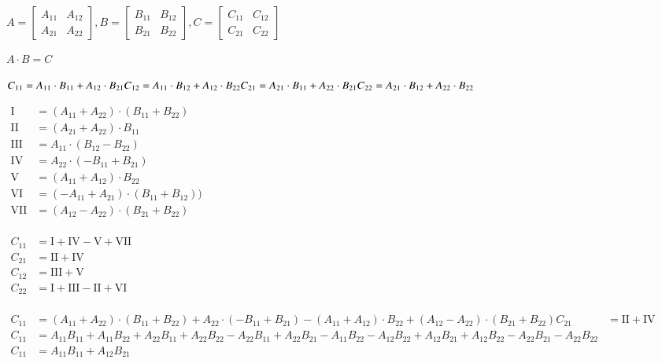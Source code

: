 \documentclass[border=10pt,varwidth]{standalone}
\begin{document}
$
A=
\begin{bmatrix}
A_{11} & A_{12}\\
A_{21} & A_{22}
\end{bmatrix},
B=
\begin{bmatrix}
B_{11} & B_{12}\\
B_{21} & B_{22}
\end{bmatrix},
C=
\begin{bmatrix}
C_{11} & C_{12}\\
C_{21} & C_{22}
\end{bmatrix}
$

\medskip
$
A \cdot B = C
$

\medskip
$
C_{11} = A_{11} \cdot B_{11} + A_{12} \cdot B_{21}\\
C_{12} = A_{11} \cdot B_{12} + A_{12} \cdot B_{22}\\
C_{21} = A_{21} \cdot B_{11} + A_{22} \cdot B_{21}\\
C_{22} = A_{21} \cdot B_{12} + A_{22} \cdot B_{22}
$

\medskip
\begin{math}
\begin{aligned}
\text{I}   &= (A_{11} + A_{22}) \cdot (B_{11} + B_{22}) \\
\text{II}  &= (A_{21} + A_{22}) \cdot B_{11} \\
\text{III} &= A_{11} \cdot (B_{12}-B_{22}) \\
\text{IV}  &= A_{22} \cdot (-B_{11}+B_{21}) \\
\text{V}   &= (A_{11} + A_{12}) \cdot B_{22} \\
\text{VI}  &= (-A_{11} + A_{21}) \cdot (B_{11} + B_{12})) \\
\text{VII} &= (A_{12} - A_{22}) \cdot (B_{21} + B_{22}) \\
\end{aligned}
\end{math}


\medskip
\begin{math}
\begin{aligned}
C_{11} &= \text{I} + \text{IV} - \text{V} + \text{VII} \\
C_{21} &= \text{II} + \text{IV} \\
C_{12} &= \text{III} + \text{V}\\
C_{22} &= \text{I} + \text{III} - \text{II} + \text{VI} \\
\end{aligned}
\end{math}


\medskip
\begin{math}
\begin{aligned}
C_{11} &= (A_{11} + A_{22}) \cdot (B_{11} + B_{22}) + A_{22} \cdot (-B_{11}+B_{21}) - (A_{11} + A_{12}) \cdot B_{22} + (A_{12} - A_{22}) \cdot (B_{21} + B_{22})C_{21} &= \text{II} + \text{IV} \\
C_{11} &= A_{11}B_{11} + A_{11}B_{22} + A_{22}B_{11} + A_{22}B_{22} -A_{22}B_{11}+A_{22}B_{21} - A_{11}B_{22} - A_{12}B_{22}+ A_{12}B_{21} + A_{12}B_{22} - A_{22}B_{21} - A_{22}B_{22} \\
C_{11} &= A_{11}B_{11} + A_{12}B_{21}
\end{aligned}
\end{math}
\end{document}

